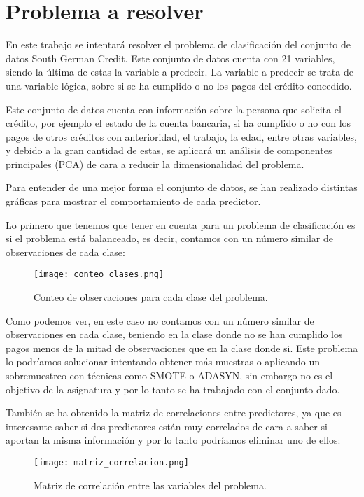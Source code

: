 \section{Problema a resolver}

En este trabajo se intentará resolver el problema de clasificación del conjunto de datos South German Credit. Este conjunto de datos cuenta con 21 variables, siendo la última de estas la variable a predecir. La variable a predecir se trata de una variable lógica, sobre si se ha cumplido o no los pagos del crédito concedido.

Este conjunto de datos cuenta con información sobre la persona que solicita el crédito, por ejemplo el estado de la cuenta bancaria, si ha cumplido o no con los pagos de otros créditos con anterioridad, el trabajo, la edad, entre otras variables, y debido a la gran cantidad de estas, se aplicará un análisis de componentes principales (PCA) de cara a reducir la dimensionalidad del problema.

Para entender de una mejor forma el conjunto de datos, se han realizado distintas gráficas para mostrar el comportamiento de cada predictor.

Lo primero que tenemos que tener en cuenta para un problema de clasificación es si el problema está balanceado, es decir, contamos con un número similar de observaciones de cada clase:

\begin{figure}[H]
	\centering
	\texttt{[image: conteo\_clases.png]}
	\caption{Conteo de observaciones para cada clase del problema.}
	\label{fig:conteo_clases}
\end{figure}

Como podemos ver, en este caso no contamos con un número similar de observaciones en cada clase, teniendo en la clase donde no se han cumplido los pagos menos de la mitad de observaciones que en la clase donde si. Este problema lo podríamos solucionar intentando obtener más muestras o aplicando un sobremuestreo con técnicas como SMOTE o ADASYN, sin embargo no es el objetivo de la asignatura y por lo tanto se ha trabajado con el conjunto dado.

También se ha obtenido la matriz de correlaciones entre predictores, ya que es interesante saber si dos predictores están muy correlados de cara a saber si aportan la misma información y por lo tanto podríamos eliminar uno de ellos:

\begin{figure}[H]
	\centering
	\texttt{[image: matriz\_correlacion.png]}
	\caption{Matriz de correlación entre las variables del problema.}
	\label{fig:matriz_correlacion}
\end{figure}


